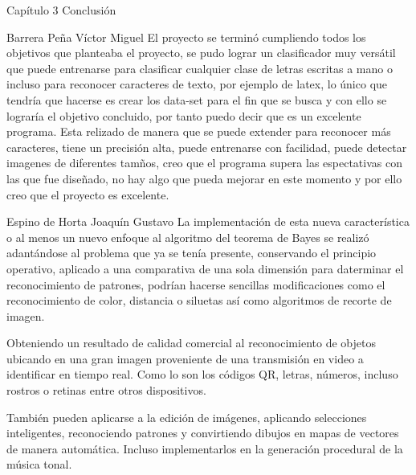 \documentclass[
  spanish,
  ignorenonframetext,
]{beamer}
\begin{document}
\begin{frame}{Capítulo 3 Conclusión}
\protect\hypertarget{capuxedtulo-3-conclusiuxf3n}{}
\begin{block}{Barrera Peña Víctor Miguel}
\protect\hypertarget{barrera-peuxf1a-vuxedctor-miguel}{}
El proyecto se terminó cumpliendo todos los objetivos que planteaba el
proyecto, se pudo lograr un clasificador muy versátil que puede
entrenarse para clasificar cualquier clase de letras escritas a mano o
incluso para reconocer caracteres de texto, por ejemplo de latex, lo
único que tendría que hacerse es crear los data-set para el fin que se
busca y con ello se lograría el objetivo concluido, por tanto puedo
decir que es un excelente programa. Esta relizado de manera que se puede
extender para reconocer más caracteres, tiene un precisión alta, puede
entrenarse con facilidad, puede detectar imagenes de diferentes tamños,
creo que el programa supera las espectativas con las que fue diseñado,
no hay algo que pueda mejorar en este momento y por ello creo que el
proyecto es excelente.
\end{block}

\begin{block}{Espino de Horta Joaquín Gustavo}
\protect\hypertarget{espino-de-horta-joaquuxedn-gustavo}{}
La implementación de esta nueva característica o al menos un nuevo
enfoque al algoritmo del teorema de Bayes se realizó adantándose al
problema que ya se tenía presente, conservando el principio operativo,
aplicado a una comparativa de una sola dimensión para daterminar el
reconocimiento de patrones, podrían hacerse sencillas modificaciones
como el reconocimiento de color, distancia o siluetas así como
algoritmos de recorte de imagen.

Obteniendo un resultado de calidad comercial al reconocimiento de
objetos ubicando en una gran imagen proveniente de una transmisión en
video a identificar en tiempo real. Como lo son los códigos QR, letras,
números, incluso rostros o retinas entre otros dispositivos.

También pueden aplicarse a la edición de imágenes, aplicando selecciones
inteligentes, reconociendo patrones y convirtiendo dibujos en mapas de
vectores de manera automática. Incluso implementarlos en la generación
procedural de la música tonal.
\end{block}
\end{frame}
\end{document}
